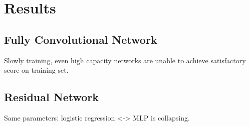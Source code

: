 \chapter{Results}

\section{Fully Convolutional Network}
Slowly training, even high capacity networks are unable to achieve satisfactory score on training set.

\section{Residual Network}
Same parameters: logistic regression <-> MLP is collapsing.
